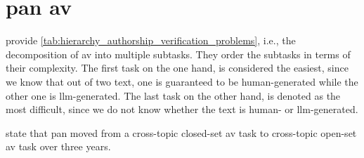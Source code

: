 \section{\acs{pan} \ac{av}}
\label{sec:pan_authorship_verification}

\citet{ayele_overview_2024} provide \autoref{tab:hierarchy_authorship_verification_problems}, i.e., 
the decomposition of \ac{av} into multiple subtasks. 
They order the subtasks in terms of their complexity.
The first task on the one hand, is considered the easiest, since we know that out of two text, one is guaranteed to be human-generated while the other one is \ac{llm}-generated.
The last task on the other hand, is denoted as the most difficult, since we do not know whether the text is human- or \ac{llm}-generated.


\begin{table}[tbp]
    \centering
    \caption{Hierarchy of \ac{av} problems \cite{ayele_overview_2024,bevendorff_overview_2024} from easiest (1) to most difficult (7), 
    where A, B corresponds to human-authored text and M denotes \ac{llm}-generated text.}
    \label{tab:hierarchy_authorship_verification_problems}
\end{table}

\citet{boenninghoff_o2d2_2021} state that \ac{pan} moved from a cross-topic closed-set \ac{av} task 
to cross-topic open-set \ac{av} task over three years.

